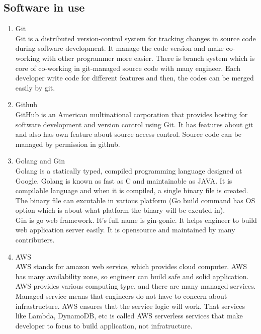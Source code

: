 \documentclass[conference]{IEEEtran}
\begin{document}
\subsection{Software in use}
\begin{enumerate}
    \item Git \\
    Git is a distributed version-control system for tracking changes in source code during software development. It manage the code version and make co-working with other programmer more easier. There is branch system which is core of co-working in git-managed source code with many engineer. Each developer write code for different features and then, the codes can be merged easily by git. \\
    
    \item Github \\
    GitHub is an American multinational corporation that provides hosting for software development and version control using Git. It has features about git and also has own feature about source access control. Source code can be managed by permission in github. \\
    
    \item Golang and Gin \\
    Golang is a statically typed, compiled programming language designed at Google. Golang is known as fast as C and maintainable as JAVA. It is compilable language and when it is compiled, a single binary file is created. The binary file can excutable in various platform (Go build command has OS option which is about what platform the binary will be excuted in). \\
    Gin is go web framework. It's full name is gin-gonic. It helps engineer to build web application server easily. It is opensource and maintained by many contributers. \\
    
    \item AWS \\
    AWS stands for amazon web service, which provides cloud computer. AWS has many availability zone, so engineer can build safe and solid application. AWS provides various computing type, and there are many managed services. Managed service means that engineers do not have to concern about infrastructure. AWS ensures that the service logic will work. That services like Lambda, DynamoDB, etc is called AWS serverless services that make developer to focus to build application, not infratructure. \\
    

\end{enumerate}
\end{document}
